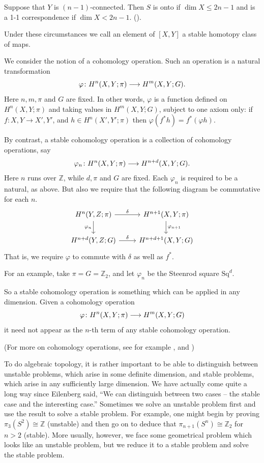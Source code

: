 \documentclass[../main]{subfiles}
\begin{document}
\begin{theorem}
    Suppose that $Y$ is $(n-1)$-connected. Then $S$ is onto if $\dim X \le 2n - 1$ and is a 1-1 correspondence if $\dim X < 2n - 1$. (\cite[p.~458]{spanier}).
\end{theorem}

Under these circumstances we call an element of $[X, Y]$ a stable homotopy class of maps.

\begin{example_different}
    We consider the notion of a cohomology operation. Such an operation is a natural transformation \[ \varphi \colon H^n(X, Y; \pi) \longrightarrow H^m(X, Y; G). \] Here $n, m, \pi$ and $G$ are fixed. In other words, $\varphi$ is a function defined on $H^n(X, Y; \pi)$ and taking values in $H^m(X, Y; G)$, subject to one axiom only: if $f \colon X, Y \to X', Y'$, and $h \in H^n(X', Y'; \pi)$ then $\varphi(f^*h) = f^*(\varphi h)$.
\end{example_different}

By contrast, a stable cohomology operation is a collection of cohomology operations, say \[\varphi_n \colon H^n(X, Y; \pi) \longrightarrow H^{n + d}(X, Y; G).\] Here $n$ runs over $\mathbb{Z}$, while $d, \pi$ and $G$ are fixed. Each $\varphi_n$ is required to be a natural, as above. But also we require that the following diagram be commutative for each $n$.
\[ 
\begin{tikzcd}
    H^n(Y, Z; \pi) \arrow[r, "\delta"] \arrow[d, "\varphi_n"'] & H^{n + 1}(X, Y; \pi) \arrow[d, "\varphi_{n + 1}"]\\ 
    H^{n + d}(Y, Z; G) \arrow[r, "\delta"] & H^{n + d + 1}(X, Y; G)
\end{tikzcd} 
\]
That is, we require $\varphi$ to commute with $\delta$ as well as $f^*$.

For an example, take $\pi = G = \mathbb Z_2$, and let $\varphi_n$ be the Steenrod square $\mathrm{Sq}^d$.

So a stable cohomology operation is something which can be applied in any dimension. Given a cohomology operation \[\varphi \colon H^n(X, Y; \pi) \longrightarrow H^m(X, Y; G) \] it need not appear as the $n$-th term of any stable cohomology operation.

(For more on cohomology operations, see for example \cite{moshertangora},\cite{steenrodepstein} and \cite[pp. 429--430]{spanier})

To do algebraic topology, it is rather important to be able to distinguish between unstable problems, which arise in some definite dimension, and stable problems, which arise in any sufficiently large dimension. We have actually come quite a long way since Eilenberg said, ``We can distinguish between two cases -- the stable case and the interesting case.'' Sometimes we solve an unstable problem first and use the result to solve a stable problem. For example, one might begin by proving $\pi_3(S^2) \cong \mathbb{Z}$ (unstable) and then go on to deduce that $\pi_{n + 1}(S^n) \cong \mathbb{Z}_2$ for $n > 2$ (stable). More usually, however, we face some geometrical problem which looks like an unstable problem, but we reduce it to a stable problem and solve the stable problem.
\end{document}
